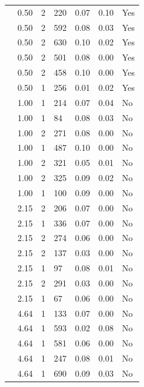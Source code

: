 \begin{longtable}{ | M{2.0cm} | M{2.0cm} | M{1.5cm} | M{1.5cm} | M{2.0cm} | M{2.0cm} | M{1.5cm} | }
                 & 0.50 & 2 & 220 & 0.07 & 0.10 & Yes \\
                 & 0.50 & 2 & 592 & 0.08 & 0.03 & Yes \\
                 & 0.50 & 2 & 630 & 0.10 & 0.02 & Yes \\
                 & 0.50 & 2 & 501 & 0.08 & 0.00 & Yes \\
                 & 0.50 & 2 & 458 & 0.10 & 0.00 & Yes \\
                 & 0.50 & 1 & 256 & 0.01 & 0.02 & Yes \\
                 & 1.00 & 1 & 214 & 0.07 & 0.04 & No  \\
                 & 1.00 & 1 & 84  & 0.08 & 0.03 & No  \\
                 & 1.00 & 2 & 271 & 0.08 & 0.00 & No  \\
                 & 1.00 & 1 & 487 & 0.10 & 0.00 & No  \\
                 & 1.00 & 2 & 321 & 0.05 & 0.01 & No  \\
                 & 1.00 & 2 & 325 & 0.09 & 0.02 & No  \\
                 & 1.00 & 1 & 100 & 0.09 & 0.00 & No  \\
                 & 2.15 & 2 & 206 & 0.07 & 0.00 & No  \\
                 & 2.15 & 1 & 336 & 0.07 & 0.00 & No  \\
                 & 2.15 & 2 & 274 & 0.06 & 0.00 & No  \\
                 & 2.15 & 2 & 137 & 0.03 & 0.00 & No  \\
                 & 2.15 & 1 & 97  & 0.08 & 0.01 & No  \\
                 & 2.15 & 2 & 291 & 0.03 & 0.00 & No  \\
                 & 2.15 & 1 & 67  & 0.06 & 0.00 & No  \\
                 & 4.64 & 1 & 133 & 0.07 & 0.00 & No \\
                 & 4.64 & 1 & 593 & 0.02 & 0.08 & No \\
                 & 4.64 & 1 & 581 & 0.06 & 0.00 & No \\
                 & 4.64 & 1 & 247 & 0.08 & 0.01 & No \\
                 & 4.64 & 1 & 690 & 0.09 & 0.03 & No \\

\end{longtable}
